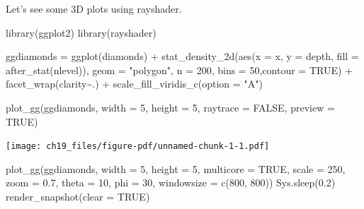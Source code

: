 \documentclass[
  letterpaper,
]{scrbook}
\newenvironment{Shaded}{\begin{snugshade}}{\end{snugshade}}
\newcommand{\AttributeTok}[1]{\textcolor[rgb]{0.40,0.45,0.13}{#1}}
\newcommand{\ConstantTok}[1]{\textcolor[rgb]{0.56,0.35,0.01}{#1}}
\newcommand{\DecValTok}[1]{\textcolor[rgb]{0.68,0.00,0.00}{#1}}
\newcommand{\FloatTok}[1]{\textcolor[rgb]{0.68,0.00,0.00}{#1}}
\newcommand{\FunctionTok}[1]{\textcolor[rgb]{0.28,0.35,0.67}{#1}}
\newcommand{\NormalTok}[1]{\textcolor[rgb]{0.00,0.23,0.31}{#1}}
\newcommand{\OtherTok}[1]{\textcolor[rgb]{0.00,0.23,0.31}{#1}}
\newcommand{\SpecialCharTok}[1]{\textcolor[rgb]{0.37,0.37,0.37}{#1}}
\newcommand{\StringTok}[1]{\textcolor[rgb]{0.13,0.47,0.30}{#1}}
\begin{document}
Let's see some 3D plots using rayshader.

\begin{Shaded}
\begin{Highlighting}[]
\FunctionTok{library}\NormalTok{(ggplot2)}
\FunctionTok{library}\NormalTok{(rayshader)}

\NormalTok{ggdiamonds }\OtherTok{=} \FunctionTok{ggplot}\NormalTok{(diamonds) }\SpecialCharTok{+}
  \FunctionTok{stat\_density\_2d}\NormalTok{(}\FunctionTok{aes}\NormalTok{(}\AttributeTok{x =}\NormalTok{ x, }\AttributeTok{y =}\NormalTok{ depth, }\AttributeTok{fill =} \FunctionTok{after\_stat}\NormalTok{(nlevel)), }
                  \AttributeTok{geom =} \StringTok{"polygon"}\NormalTok{, }\AttributeTok{n =} \DecValTok{200}\NormalTok{, }\AttributeTok{bins =} \DecValTok{50}\NormalTok{,}\AttributeTok{contour =} \ConstantTok{TRUE}\NormalTok{) }\SpecialCharTok{+}
  \FunctionTok{facet\_wrap}\NormalTok{(clarity}\SpecialCharTok{\textasciitilde{}}\NormalTok{.) }\SpecialCharTok{+}
  \FunctionTok{scale\_fill\_viridis\_c}\NormalTok{(}\AttributeTok{option =} \StringTok{"A"}\NormalTok{)}

\FunctionTok{plot\_gg}\NormalTok{(ggdiamonds, }\AttributeTok{width =} \DecValTok{5}\NormalTok{, }\AttributeTok{height =} \DecValTok{5}\NormalTok{, }\AttributeTok{raytrace =} \ConstantTok{FALSE}\NormalTok{, }\AttributeTok{preview =} \ConstantTok{TRUE}\NormalTok{)}
\end{Highlighting}
\end{Shaded}

\texttt{[image: ch19\_files/figure-pdf/unnamed-chunk-1-1.pdf]}

\begin{Shaded}
\begin{Highlighting}[]
\FunctionTok{plot\_gg}\NormalTok{(ggdiamonds, }\AttributeTok{width =} \DecValTok{5}\NormalTok{, }\AttributeTok{height =} \DecValTok{5}\NormalTok{, }\AttributeTok{multicore =} \ConstantTok{TRUE}\NormalTok{, }\AttributeTok{scale =} \DecValTok{250}\NormalTok{, }
        \AttributeTok{zoom =} \FloatTok{0.7}\NormalTok{, }\AttributeTok{theta =} \DecValTok{10}\NormalTok{, }\AttributeTok{phi =} \DecValTok{30}\NormalTok{, }\AttributeTok{windowsize =} \FunctionTok{c}\NormalTok{(}\DecValTok{800}\NormalTok{, }\DecValTok{800}\NormalTok{))}
\FunctionTok{Sys.sleep}\NormalTok{(}\FloatTok{0.2}\NormalTok{)}
\FunctionTok{render\_snapshot}\NormalTok{(}\AttributeTok{clear =} \ConstantTok{TRUE}\NormalTok{)}
\end{Highlighting}
\end{Shaded}
\end{document}
